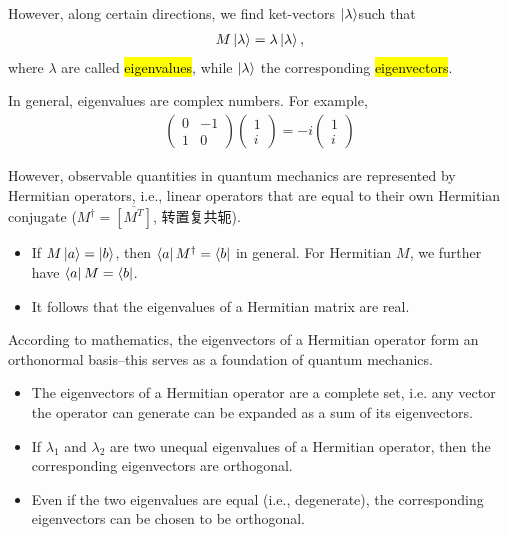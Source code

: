 However, along certain directions, we find ket-vectors $\ket{\lambda}$such that
\begin{align*}
    M\ket{\lambda} = \lambda\ket{\lambda},
\end{align*}
where $\lambda$ are called \hl{eigenvalues}, while $\ket{\lambda}$ the corresponding \hl{eigenvectors}.

In general, eigenvalues are complex numbers. For example,
\begin{align*}
    \begin{pmatrix}
        0 & -1 \\ 1 & 0 
    \end{pmatrix}\begin{pmatrix}
        1\\ i
    \end{pmatrix}=-i\begin{pmatrix}
        1\\ i
    \end{pmatrix}
\end{align*}

However, observable quantities in quantum mechanics are represented by Hermitian operators, i.e., linear operators that are equal to their own Hermitian conjugate ($M^{\dagger}=\overline{\left[M^T\right]}$, 转置复共轭). 
\begin{itemize}
    \item If $M\ket{a}=\ket{b}$, then $\bra{a}M^{\dagger}=\bra{b}$ in general. For Hermitian $M$, we further have $\bra{a}M=\bra{b}$. 
    \item It follows that the eigenvalues of a Hermitian matrix are real.
\end{itemize}

According to mathematics, the eigenvectors of a Hermitian operator form an orthonormal basis–this serves as a foundation of quantum mechanics. 
\begin{itemize}
    \item The eigenvectors of a Hermitian operator are a complete set, i.e. any vector the operator can generate can be expanded as a sum of its eigenvectors.
    \item If $\lambda_1$ and $\lambda_2$ are two unequal eigenvalues of a Hermitian operator, then the corresponding eigenvectors are orthogonal.
    \item Even if the two eigenvalues are equal (i.e., degenerate), the corresponding eigenvectors can be chosen to be orthogonal. 
\end{itemize}

